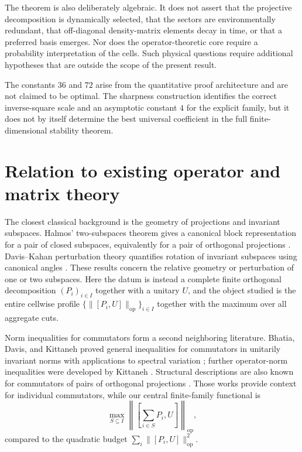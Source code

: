 \documentclass[11pt]{article}
\newcommand{\op}{\mathrm{op}}
\begin{document}
The theorem is also deliberately algebraic.  It does not assert that the
projective decomposition is dynamically selected, that the sectors are
environmentally redundant, that off-diagonal density-matrix elements decay
in time, or that a preferred basis emerges.  Nor does the operator-theoretic
core require a probability interpretation of the cells.  Such physical
questions require additional hypotheses that are outside the scope of the
present result.

The constants $36$ and $72$ arise from the quantitative proof architecture
and are not claimed to be optimal.  The sharpness construction identifies the
correct inverse-square scale and an asymptotic constant $4$ for the explicit
family, but it does not by itself determine the best universal coefficient in
the full finite-dimensional stability theorem.

\section{Relation to existing operator and matrix theory}
\label{sec:related}

The closest classical background is the geometry of projections and invariant
subspaces.  Halmos' two-subspaces theorem gives a canonical block
representation for a pair of closed subspaces, equivalently for a pair of
orthogonal projections \cite{Halmos1969TwoSubspaces}.  Davis--Kahan
perturbation theory quantifies rotation of invariant subspaces using canonical
angles \cite{DavisKahan1970}.  These results concern the relative geometry or
perturbation of one or two subspaces.  Here the datum is instead a complete
finite orthogonal decomposition $(P_i)_{i\in I}$ together with a unitary $U$,
and the object studied is the entire cellwise profile
$\{\|[P_i,U]\|_{\op}\}_{i\in I}$ together with the maximum over all aggregate
cuts.

Norm inequalities for commutators form a second neighboring literature.
Bhatia, Davis, and Kittaneh proved general inequalities for commutators in
unitarily invariant norms with applications to spectral variation
\cite{BhatiaDavisKittaneh1991}; further operator-norm inequalities were
developed by Kittaneh \cite{Kittaneh2007}.  Structural descriptions are also
known for commutators of pairs of orthogonal projections
\cite{Li2004}.  Those works provide context for individual commutators, while
our central finite-family functional is
\[
  \max_{S\subseteq I}
  \left\|
    \left[\sum_{i\in S}P_i,U\right]
  \right\|_{\op},
\]
compared to the quadratic budget
$\sum_i\|[P_i,U]\|_{\op}^2$.
\end{document}
